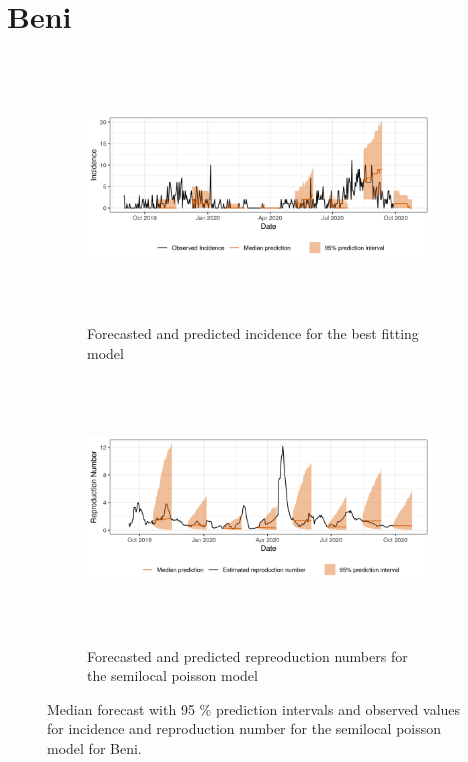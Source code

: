  \section{ Beni }\begin{figure}[H]\begin{subfigure}{\textwidth}  \centering  \includegraphics[width=0.9\linewidth, height=7cm]{../output/Beni_predictions.png}  \caption{Forecasted and predicted incidence for the best fitting model}\end{subfigure}

\begin{subfigure}{\textwidth}  \centering  \includegraphics[width=0.9\linewidth, height=7cm]{../output/Beni_Rs.png}  \caption{Forecasted and predicted repreoduction numbers for the semilocal poisson model}\end{subfigure}  \caption{Median forecast with 95 \% prediction intervals and observed values for incidence and reproduction number for the semilocal poisson model for Beni.}\end{figure}

